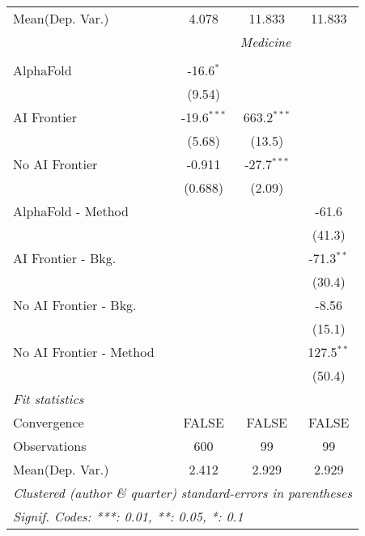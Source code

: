 \begin{tabular}{lccc}
Mean(Dep. Var.) & 4.078 & 11.833 & 11.833 \\
 & \multicolumn{3}{c}{\textit{Medicine}} \\ \\
   AlphaFold               & -16.6$^{*}$   &               &   \\   
                           & (9.54)        &               &   \\   
   AI Frontier             & -19.6$^{***}$ & 663.2$^{***}$ &   \\   
                           & (5.68)        & (13.5)        &   \\   
   No AI Frontier          & -0.911        & -27.7$^{***}$ &   \\   
                           & (0.688)       & (2.09)        &   \\   
   AlphaFold - Method      &               &               & -61.6\\   
                           &               &               & (41.3)\\   
   AI Frontier - Bkg.      &               &               & -71.3$^{**}$\\   
                           &               &               & (30.4)\\   
   No AI Frontier - Bkg.   &               &               & -8.56\\   
                           &               &               & (15.1)\\   
   No AI Frontier - Method &               &               & 127.5$^{**}$\\   
                           &               &               & (50.4)\\   
   \midrule
   \emph{Fit statistics}\\
   Convergence             &FALSE          & FALSE         & FALSE\\  
   Observations            & 600           & 99            & 99\\  
Mean(Dep. Var.) & 2.412 & 2.929 & 2.929 \\
   \midrule \midrule
   \multicolumn{4}{l}{\emph{Clustered (author \& quarter) standard-errors in parentheses}}\\
   \multicolumn{4}{l}{\emph{Signif. Codes: ***: 0.01, **: 0.05, *: 0.1}}\\
\end{tabular}
\par\endgroup
